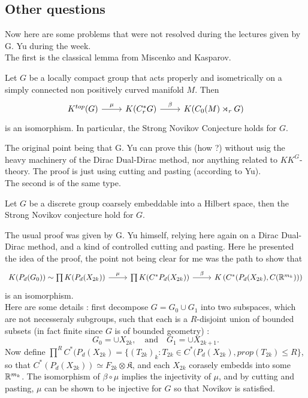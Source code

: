 \subsection{Other questions}
Now here are some problems that were not resolved during the lectures given by G. Yu during the week.\\

The first is the classical lemma from Miscenko and Kasparov.

\begin{prop}
Let $G$ be a locally compact group that acts properly and isometrically on a simply connected non positively curved manifold $M$. Then
\[\begin{tikzcd}K^{top}(G)\arrow{r}{\mu} & K(C_r^*G)\arrow{r}{\beta} & K(C_0(M)\rtimes_r G)\end{tikzcd}\]
is an isomorphism. In particular, the Strong Novikov Conjecture holds for $G$.
\end{prop}

The original point being that G. Yu can prove this (how ?) without usig the heavy machinery of the Dirac Dual-Dirac method, nor anything related to $KK^G$-theory. The proof is just using cutting and pasting (according to Yu).\\

The second is of the same type.

\begin{prop}
Let $G$ be a discrete group coarsely embeddable into a Hilbert space, then the Strong Novikov conjecture hold for $G$.                                       
\end{prop}

The usual proof was given by G. Yu himself, relying here again on a Dirac Dual-Dirac method, and a kind of controlled cutting and pasting. Here he presented the idea of the proof, the point not being clear for me was the path to show that 
\[\begin{tikzcd}K(P_d(G_0))\sim \prod K(P_d(X_{2k}))\arrow{r}{\mu} & \prod K(C^*P_d(X_{2k}))\arrow{r}{\beta} & K\left(C^*(P_d(X_{2k}),C(\R^{m_k}))\right)\end{tikzcd}\]
is an isomorphism.\\

Here are some details : first decompose $G=G_0\cup G_1$ into two subspaces, which are not necesseraly subgroups, such that each is a $R$-disjoint union of bounded subsets (in fact finite since $G$ is of bounded geometry) :
\[G_0=\cup X_{2k},\quad \text{and}\quad G_1=\cup X_{2k+1}.\]
Now define $\prod^R C^*(P_d(X_{2k}) = \{(T_{2k})_k : T_{2k}\in C^*(P_d(X_{2k}), prop(T_{2k})\leq R\}$, so that $C^*(P_d(X_{2k}))\simeq F_{2k}\otimes \mathfrak K$, and each $X_{2k}$ corasely embedds into some $\mathbb R^{m_k}$. The isomorphism of $\beta\circ \mu$ implies the injectivity of $\mu$, and by cutting and pasting, $\mu$ can be shown to be injective for $G$ so that Novikov is satisfied.
